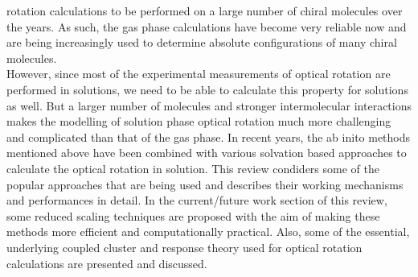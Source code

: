 rotation calculations to be performed on a large number of chiral molecules over the years.  As
such, the gas phase calculations have become very reliable now and are being
increasingly used to determine absolute configurations of many chiral molecules.\cite{Kondru99} \\However, since most of the experimental measurements of optical rotation are
performed in solutions, we need to be able to calculate this property for solutions
as well. But a larger number of molecules and stronger intermolecular interactions
makes the modelling of solution phase optical rotation much more challenging and
complicated than that of the gas phase. In recent years, the ab inito methods
mentioned above have been combined with various solvation based
approaches\cite{Neugebauer05,Neugebauer09,Mennucci02,Tomasi05,JensenGordon96}
to calculate the optical rotation in solution. This review condiders some of
the popular approaches that are being used and describes their working
mechanisms and performances in detail. In the current/future work section of
this review, some reduced scaling techniques are proposed with the aim of
making these methods more efficient and computationally practical. Also, some
of the essential, underlying coupled cluster and response theory used for
optical rotation calculations are presented and discussed.


